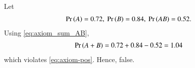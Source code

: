 Let 
\begin{align}
\Pr\left(A\right) = 0.72,\
\Pr\left(B\right) = 0.84,\
\Pr\left(AB\right) = 0.52.
\end{align}
Using
\eqref{eq:axiom_sum_AB},
\begin{align}
\Pr\left(A+B\right) 
= 0.72 + 0.84 - 0.52
= 1.04
\end{align}
which violates
	\eqref{eq:axiom-pos}.
Hence, false. 
